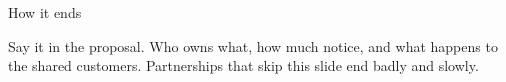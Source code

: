 \begin{frame}{How it ends}
  \begin{glass}
  Say it in the proposal. Who owns what, how much notice, and what happens to the shared
  customers. Partnerships that skip this slide end badly and slowly.
  \end{glass}
\end{frame}
